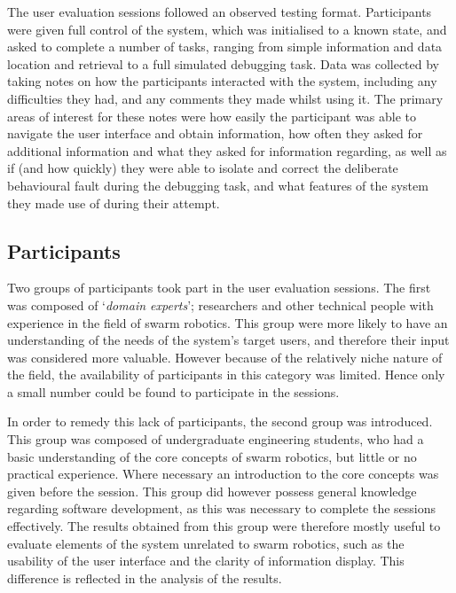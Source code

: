 The user evaluation sessions followed an observed testing format. Participants were given full control of the system, which was initialised to a known state, and asked to complete a number of tasks, ranging from simple information and data location and retrieval to a full simulated debugging task. Data was collected by taking notes on how the participants interacted with the system, including any difficulties they had, and any comments they made whilst using it. The primary areas of interest for these notes were how easily the participant was able to navigate the user interface and obtain information, how often they asked for additional information and what they asked for information regarding, as well as if (and how quickly) they were able to isolate and correct the deliberate behavioural fault during the debugging task, and what features of the system they made use of during their attempt.

\subsection{Participants}
Two groups of participants took part in the user evaluation sessions. The first was composed of `\textit{domain experts}'; researchers and other technical people with experience in the field of swarm robotics. This group were more likely to have an understanding of the needs of the system's target users, and therefore their input was considered more valuable. However because of the relatively niche nature of the field, the availability of participants in this category was limited. Hence only a small number could be found to participate in the sessions.

In order to remedy this lack of participants, the second group was introduced. This group was composed of undergraduate engineering students, who had a basic understanding of the core concepts of swarm robotics, but little or no practical experience. Where necessary an introduction to the core concepts was given before the session. This group did however possess general knowledge regarding software development, as this was necessary to complete the sessions effectively. The results obtained from this group were therefore mostly useful to evaluate elements of the system unrelated to swarm robotics, such as the usability of the user interface and the clarity of information display. This difference is reflected in the analysis of the results.

